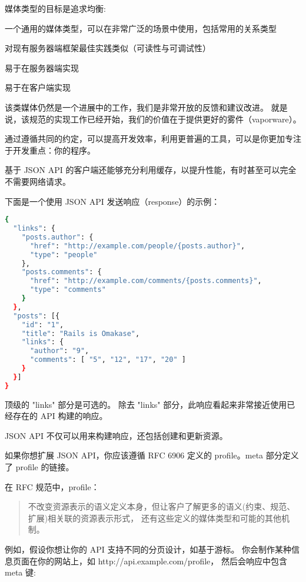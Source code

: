 媒体类型的目标是追求均衡:

\begin{compactitem}
\item 一个通用的媒体类型，可以在非常广泛的场景中使用，包括常用的关系类型
\item 对现有服务器端框架最佳实践类似（可读性与可调试性）
\item 易于在服务器端实现
\item 易于在客户端实现
\end{compactitem}

该类媒体仍然是一个进展中的工作，我们是非常开放的反馈和建议改进。 就是说，该规范的实现工作已经开始，我们的价值在于提供更好的雾件（vaporware）。



通过遵循共同的约定，可以提高开发效率，利用更普遍的工具，可以是你更加专注于开发重点：你的程序。

基于 JSON API 的客户端还能够充分利用缓存，以提升性能，有时甚至可以完全不需要网络请求。

下面是一个使用 JSON API 发送响应（response）的示例：


\begin{lstlisting}[language=bash]
{
  "links": {
    "posts.author": {
      "href": "http://example.com/people/{posts.author}",
      "type": "people"
    },
    "posts.comments": {
      "href": "http://example.com/comments/{posts.comments}",
      "type": "comments"
    }
  },
  "posts": [{
    "id": "1",
    "title": "Rails is Omakase",
    "links": {
      "author": "9",
      "comments": [ "5", "12", "17", "20" ]
    }
  }]
}
\end{lstlisting}


顶级的 "links" 部分是可选的。 除去 "links" 部分，此响应看起来非常接近使用已经存在的 API 构建的响应。

JSON API 不仅可以用来构建响应，还包括创建和更新资源。

如果你想扩展 JSON API，你应该遵循 RFC 6906 定义的 profile。meta 部分定义了 profile 的链接。

在 RFC 规范中，profile：

\begin{quote}
不改变资源表示的语义定义本身，但让客户了解更多的语义(约束、规范、扩展)相关联的资源表示形式， 还有这些定义的媒体类型和可能的其他机制。
\end{quote}


例如，假设你想让你的 API 支持不同的分页设计，如基于游标。 你会制作某种信息页面在你的网站上，如 http://api.example.com/profile， 然后会响应中包含 meta 键:

